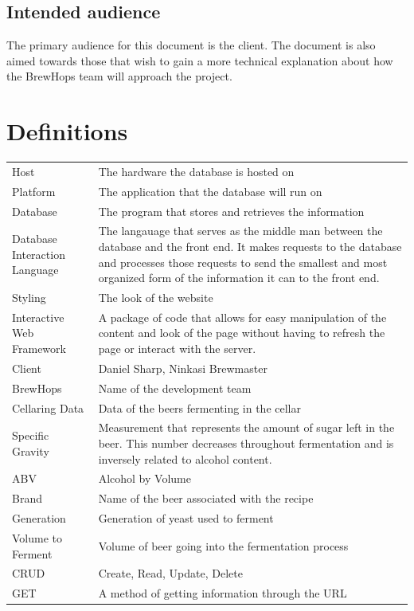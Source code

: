 \documentclass[draftclsnofoot,onecolumn,letterpaper,10pt]{IEEEtran}
\begin{document}
	\subsection{Intended audience}
	The primary audience for this document is the client.
	The document is also aimed towards those that wish to gain a more technical explanation about how the BrewHops team will approach the project.

\section{Definitions}
\begin{longtable}{p{4cm}p{12cm}}
    Host & The hardware the database is hosted on \\
    Platform & The application that the database will run on \\
    Database & The program that stores and retrieves the information \\
    Database Interaction Language & The langauage that serves as the middle man between the database and the front end. It makes requests to the database and processes those requests to send the smallest and most organized form of the information it can to the front end. \\
    Styling & The look of the website \\
    Interactive Web Framework & A package of code that allows for easy manipulation of the content and look of the page without having to refresh the page or interact with the server. \\
    Client & Daniel Sharp, Ninkasi Brewmaster \\
    BrewHops & Name of the development team \\
    Cellaring Data & Data of the beers fermenting in the cellar \\
    Specific Gravity & Measurement that represents the amount of sugar left in the beer. This number decreases throughout fermentation and is inversely related to alcohol content. \\
    ABV & Alcohol by Volume \\
    Brand & Name of the beer associated with the recipe \\
    Generation & Generation of yeast used to ferment \\
    Volume to Ferment & Volume of beer going into the fermentation process \\
    CRUD & Create, Read, Update, Delete \\
    GET & A method of getting information through the URL \\

\end{longtable}
\end{document}
